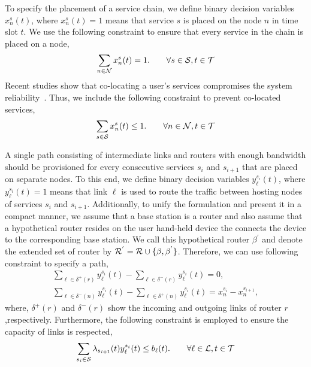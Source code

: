  To specify the placement of a service chain, we define binary decision variables $x_{n}^{s}(t)$, where $x_{n}^{s}(t)=1$ means that service $s$ is placed on the node $n$ in time slot $t$. We use the following constraint to ensure that every service in the chain is placed on a node,
\begin{gather}
	\sum_{n\in\mathcal{N}} x_{n}^{s}(t) = 1. 
	\qquad 
	\forall s\in\mathcal{S}, t\in\mathcal{T}
\end{gather}
Recent studies show that co-locating a user's services compromises the system reliability~\cite{colocatingService}. Thus, we include the following constraint to prevent co-located services,
\begin{gather}
	\sum_{s\in\mathcal{S}} x_{n}^{s}(t) \le 1. 
	\qquad 
	\forall n\in\mathcal{N}, t\in\mathcal{T}
\end{gather}

A single path consisting of intermediate links and routers with enough bandwidth should be provisioned for every consecutive services $s_{i}$ and $s_{i+1}$ that are placed on separate nodes. To this end, we define binary decision variables $y_{\ell}^{s_{i}}(t)$, where $y_{\ell}^{s_{i}}(t)=1$ means that link $\ell$ is used to route the traffic between hosting nodes of services $s_{i}$ and $s_{i+1}$. Additionally, to unify the formulation and present it in a compact manner, we assume that a base station is a router and also assume that a hypothetical router resides on the user hand-held device the connects the device to the corresponding base station. We call this hypothetical router $\beta^{'}$ and denote the extended set of router by $\mathcal{R}^{'}=\mathcal{R}\cup\{\beta, \beta^{'}\}$. Therefore, we can use following constraint to specify a path,
\begin{gather}
	\textstyle\sum_{\ell\in\delta^{+}(r)} y_{\ell}^{s_{i}}(t)
	- \textstyle\sum_{\ell\in\delta^{-}(r)} y_{\ell}^{s_{i}}(t) = 0, \\
	\textstyle\sum_{\ell\in\delta^{-}(n)} y_{\ell}^{s_{i}}(t)
	- \textstyle\sum_{\ell\in\delta^{+}(n)} y_{\ell}^{s_{i}}(t)
	= x_{n}^{s_i} - x_{n}^{s_{i+1}},
\end{gather}
where, $\delta^{+}(r)$ and $\delta^{-}(r)$ show the incoming and outgoing links of router $r$,respectively. Furthermore, the following constraint is employed to ensure the capacity of links is respected,
\begin{gather}
	\sum_{s_{i}\in\mathcal{S}} \lambda_{s_{i+1}}(t)y_{\ell}^{s_{i}}(t) \le b_{\ell}(t).
	\qquad
	\forall \ell\in\mathcal{L}, t\in\mathcal{T}
\end{gather}

